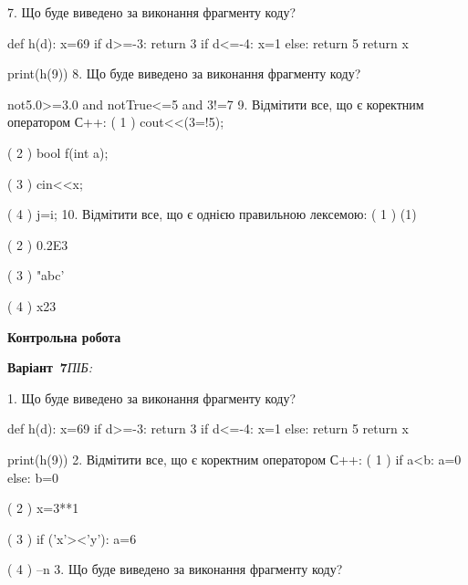 \documentclass[11pt]{article}
\begin{document}
\vspace{5mm}
7. Що буде виведено за виконання фрагменту коду?

def h(d):
    x=69
    if d>=-3: 
        return 3
    if d<=-4:
         x=1
    else:
         return 5
    return x

print(h(9))
\vspace{5mm}
8. Що буде виведено за виконання фрагменту коду?

not5.0>=3.0 and notTrue<=5 and 3!=7
\vspace{5mm}
9. %
Відмітити все, що є коректним оператором С++:
( 1 ) cout<<(3=!5);

( 2 ) bool f(int a);

( 3 ) cin<<x;

( 4 ) j=i;
\vspace{5mm}
10. %
Відмітити все, що є однією правильною лексемою:
( 1 ) (1)

( 2 ) 0.2E3

( 3 ) "abc'

( 4 ) x23
\vspace{5mm}










\newpage

\newpage

{\large\textbf{Контрольна робота}}

\textbf{Варіант \No\,7}\hfill \textit{ПІБ:}\,\underline{\hspace{60mm}}
\vspace{4mm}

1. Що буде виведено за виконання фрагменту коду?

def h(d):
    x=69
    if d>=-3: 
        return 3
    if d<=-4:
         x=1
    else:
         return 5
    return x

print(h(9))
\vspace{5mm}
2. %
Відмітити все, що є коректним оператором С++:
( 1 ) if a<b: a=0 else: b=0

( 2 ) x=3**1

( 3 ) if ('x'><'y'): a=6

( 4 ) --n
\vspace{5mm}
3. Що буде виведено за виконання фрагменту коду?
\end{document}
